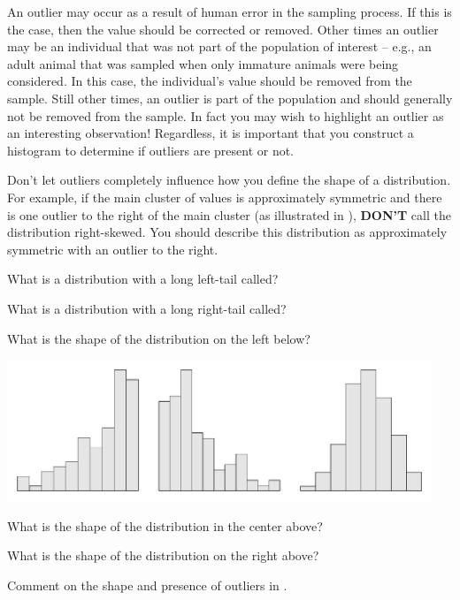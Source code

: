 An outlier may occur as a result of human error in the sampling process. If this is the case, then the value should be corrected or removed. Other times an outlier may be an individual that was not part of the population of interest -- e.g., an adult animal that was sampled when only immature animals were being considered. In this case, the individual's value should be removed from the sample. Still other times, an outlier is part of the population and should generally not be removed from the sample. In fact you may wish to highlight an outlier as an interesting observation! Regardless, it is important that you construct a histogram to determine if outliers are present or not.

Don't let outliers completely influence how you define the shape of a distribution. For example, if the main cluster of values is approximately symmetric and there is one outlier to the right of the main cluster (as illustrated in ), \textbf{DON'T} call the distribution right-skewed. You should describe this distribution as approximately symmetric with an outlier to the right.


\vspace{-12pt}

\vspace{24pt}
\begin{exsection}
  \item \label{revex:quEDALSkew} What is a distribution with a long left-tail called? 
  \item \label{revex:quEDARSkew} What is a distribution with a long right-tail called? 
  \item \label{revex:quEDALSkewg} What is the shape of the distribution on the left below? 


\begin{center}
  \includegraphics[width=5in]{Figs/HistQuest-1}
\end{center}
  \item \label{revex:quEDASymg} What is the shape of the distribution in the center above? 
  \item \label{revex:quEDARSkewg} What is the shape of the distribution on the right above? 
  \item \label{revex:quEDAlead} Comment on the shape and presence of outliers in . 
\end{exsection}



